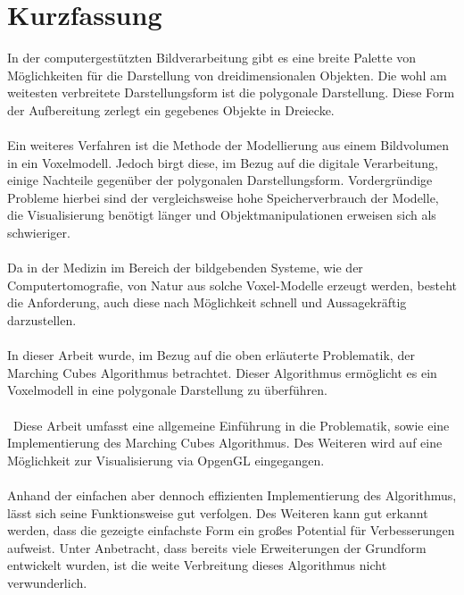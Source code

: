 
\chapter*{Kurzfassung}
In der computergestützten Bildverarbeitung gibt es eine breite Palette von Möglichkeiten für die Darstellung von dreidimensionalen Objekten. Die wohl am weitesten verbreitete Darstellungsform ist die polygonale Darstellung. Diese Form der Aufbereitung zerlegt ein gegebenes Objekte in Dreiecke. 
\\\\
Ein weiteres Verfahren ist die Methode der Modellierung aus einem Bildvolumen in ein Voxelmodell. Jedoch birgt diese, im Bezug auf die digitale Verarbeitung, einige Nachteile gegenüber der polygonalen Darstellungsform. Vordergründige Probleme hierbei sind der vergleichsweise hohe Speicherverbrauch der Modelle, die Visualisierung benötigt länger und Objektmanipulationen erweisen sich als schwieriger.
\\\\
Da in der Medizin im Bereich der bildgebenden Systeme, wie der Computertomografie, von Natur aus solche Voxel-Modelle erzeugt werden, besteht die Anforderung, auch diese nach Möglichkeit schnell und Aussagekräftig darzustellen.
\\\\
In dieser Arbeit wurde, im Bezug auf die oben erläuterte Problematik, der Marching Cubes Algorithmus betrachtet. Dieser Algorithmus ermöglicht es ein Voxelmodell in eine polygonale Darstellung zu überführen. 
\\\\\
Diese Arbeit umfasst eine allgemeine Einführung in die Problematik, sowie eine Implementierung des Marching Cubes Algorithmus. Des Weiteren wird auf eine Möglichkeit zur Visualisierung via OpgenGL eingegangen.
\\\\
Anhand der einfachen aber dennoch effizienten Implementierung des Algorithmus, lässt sich seine Funktionsweise gut verfolgen. Des Weiteren kann gut erkannt werden, dass die gezeigte einfachste Form ein großes Potential für Verbesserungen aufweist. Unter Anbetracht, dass bereits viele Erweiterungen der Grundform entwickelt wurden, ist die weite Verbreitung dieses Algorithmus nicht verwunderlich.
